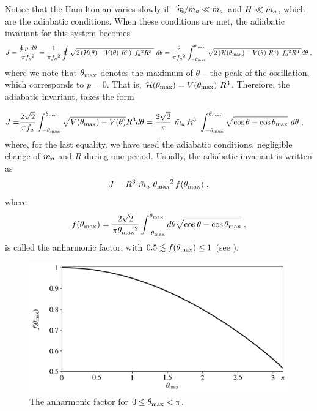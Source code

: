 \documentclass[11pt,a4paper]{article}
\begin{document}
Notice that the Hamiltonian varies slowly if $\dot {\tilde m_{a}{}}/\tilde m_{a}{} \ll \tilde m_{a}{}$ and $H \ll \tilde m_{a}{}$, which are the adiabatic conditions.  When these conditions are met, the adiabatic invariant for this system becomes
%
\begin{equation}
	J = \dfrac{\oint p \ d \theta}{\pi f_{a}{}^2} = \dfrac{1}{\pi f_{a}{}^2} \oint \sqrt{ 2\left(  \mathcal{H}(\theta) - V(\theta) \ R^3 \right) \ f_{a}{}^2 R^3 \ }  \ d \theta  =
	 \dfrac{2}{\pi f_{a}{}^2} \int_{-\theta_{\rm max}{}}^{\theta_{\rm max}{}} \sqrt{ 2\left(  \mathcal{H}(\theta_{\rm max}{}) - V(\theta) \ R^3 \right) \ f_{a}{}^2 R^3 \ } d \theta \;,
	 \label{eq:J_axion_definition}
\end{equation}
%
where we note that $\theta_{\rm max}{}$ denotes the maximum of $\theta$ -- the peak of the oscillation, which corresponds to $p=0$. That is, $\Ham(\thetamax) = V(\thetamax) \ R^3$. Therefore, the adiabatic invariant, takes the form 

\begin{eqnarray}
	J=&  \dfrac{2 \sqrt{2} }{\pi f_{a}{}}  \int_{- \theta_{\rm max}{}} ^{\theta_{\rm max}{}}  \sqrt{ V(\theta_{\rm max}) - V(\theta) } R^{3} d \theta = 
	\dfrac{2 \sqrt{2} }{\pi} \ \tilde m_{a}{} \, R^3 \ \displaystyle \int_{- \theta_{\rm max}{}}^{\theta_{\rm max}{}} \sqrt{\cos \theta - \cos \theta_{\rm max}{}} \ d \theta  
	\;,
	\label{eq:J_axion_derivation}
\end{eqnarray}
%
where, for the last equality. we have used the adiabatic conditions, \ie negligible change of $\tilde m_{a}{}$ and $R$ during one period. Usually, the adiabatic invariant is written as~\cite{Lyth:1991ub,Bae:2008ue} 
%
\begin{equation}
	J = R^3 \ \tilde m_{a}{} \ \theta_{\rm max}{}^2  \, f(\theta_{\rm max}{})  \;,
	\label{eq:J_axion_final_form}
\end{equation}
%
where 
\begin{equation}
	f(\theta_{\rm max}{}) =\dfrac{ 2 \sqrt{2}}{\pi \theta_{\rm max}{}^2 } \displaystyle \int_{- \theta_{\rm max}{}}^{\theta_{\rm max}{}} d \theta \sqrt{ \cos \theta - \cos \theta_{\rm max}{} } \;,
	\label{eq:anharmonic_f}
\end{equation}
%
is called the anharmonic factor, with $ 0.5 \lesssim f(\theta_{\rm max}{}) \leq 1$ (see ).


\begin{figure}[t]
	\includegraphics[width=1\textwidth]{figs/anharmonic_factor.pdf}
	\caption{The anharmonic factor for $0 \leq \theta_{\rm max}{} < \pi $.}
	\label{fig:anharmonic_factor}
\end{figure}
\end{document}
